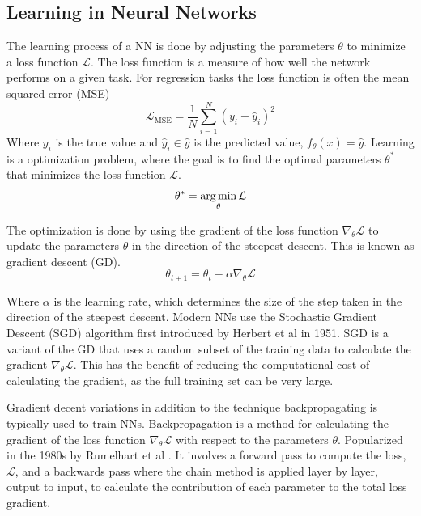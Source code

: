 \subsection{Learning in Neural Networks}
The learning process of a NN is done by adjusting the parameters $\theta$ to minimize a loss function $\mathcal{L}$. The loss function is a measure of how well the network performs on a given task.
For regression tasks the loss function is often the mean squared error (MSE) 
\begin{equation}
    \mathcal{L}_\text{MSE} = \frac{1}{N}\sum_{i=1}^N (y_i - \hat{y}_i)^2
\end{equation}
Where $y_i$ is the true value and $\hat{y}_i \in \hat{y}$ is the predicted value, $f_\theta(x) = \hat{y}$.
Learning is a optimization problem, where the goal is to find the optimal parameters $\theta^*$ that minimizes the loss function $\mathcal{L}$.
\begin{equation}
    \theta^* = \operatorname*{arg\,min}_\theta \mathcal{L}
\end{equation}

The optimization is done by using the gradient of the loss function $\nabla_\theta \mathcal{L}$ to update the parameters $\theta$ in the direction of the steepest descent. This is known as gradient descent (GD).
\begin{equation}
    \theta_{t+1} = \theta_t - \alpha \nabla_\theta \mathcal{L}
\end{equation}

Where $\alpha$ is the learning rate, which determines the size of the step taken in the direction of the steepest descent. Modern NNs use the Stochastic Gradient Descent (SGD) algorithm first introduced by Herbert et al \cite{SGD} in 1951.
SGD is a variant of the GD that uses a random subset of the training data to calculate the gradient $\nabla_\theta \mathcal{L}$. This has the benefit of reducing the computational cost of calculating the gradient, as the full training set can be very large.

Gradient decent variations in addition to the technique backpropagating is typically used to train NNs. Backpropagation is a method for calculating the gradient of the loss function $\nabla_\theta \mathcal{L}$ with respect to the parameters $\theta$. Popularized in the 1980s by Rumelhart et al \cite{backprop2}.
It involves a forward pass to compute the loss, $\mathcal{L}$, and a backwards pass where the chain method is applied layer by layer, output to input, to calculate the contribution of each parameter to the total loss gradient.

